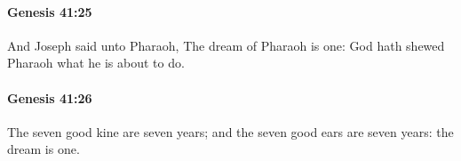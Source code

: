 		\paragraph{Genesis 41:25} %
			\label{GENESIS-41-25}

			And Joseph said unto Pharaoh, The dream of Pharaoh is one: God hath shewed Pharaoh what he is about to do.


		\paragraph{Genesis 41:26} %
			\label{GENESIS-41-26}

			The seven good kine are seven years; and the seven good ears are seven years: the dream is one.


